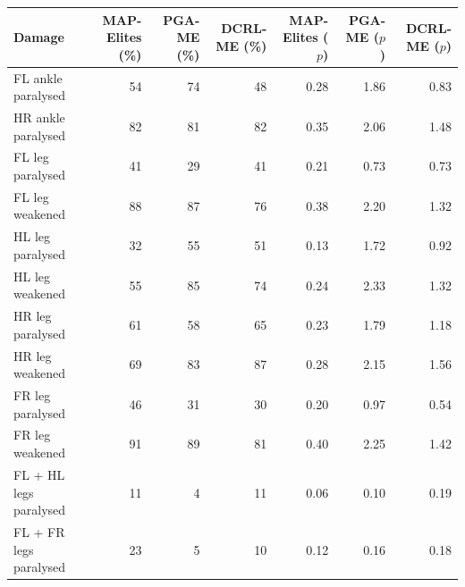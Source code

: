 \begin{tabular}{lrrrrrr}
\toprule
Damage & MAP-Elites (\%) & PGA-ME (\%) & DCRL-ME (\%) & MAP-Elites ($p$) & PGA-ME ($p$) & DCRL-ME ($p$) \\
\midrule
FL ankle paralysed & 54 & 74 & 48 & 0.28 & 1.86 & 0.83 \\
HR ankle paralysed & 82 & 81 & 82 & 0.35 & 2.06 & 1.48 \\
FL leg paralysed & 41 & 29 & 41 & 0.21 & 0.73 & 0.73 \\
FL leg weakened & 88 & 87 & 76 & 0.38 & 2.20 & 1.32 \\
HL leg paralysed & 32 & 55 & 51 & 0.13 & 1.72 & 0.92 \\
HL leg weakened & 55 & 85 & 74 & 0.24 & 2.33 & 1.32 \\
HR leg paralysed & 61 & 58 & 65 & 0.23 & 1.79 & 1.18 \\
HR leg weakened & 69 & 83 & 87 & 0.28 & 2.15 & 1.56 \\
FR leg paralysed & 46 & 31 & 30 & 0.20 & 0.97 & 0.54 \\
FR leg weakened & 91 & 89 & 81 & 0.40 & 2.25 & 1.42 \\
FL + HL legs paralysed & 11 & 4 & 11 & 0.06 & 0.10 & 0.19 \\
FL + FR legs paralysed & 23 & 5 & 10 & 0.12 & 0.16 & 0.18 \\
\bottomrule
\end{tabular}
